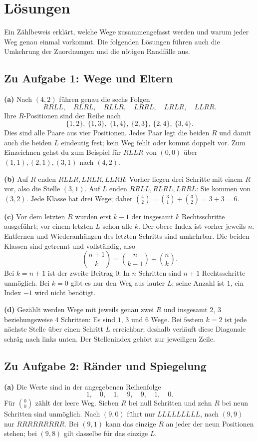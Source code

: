 \clearpage
\section{Lösungen}
\label{bin:solutions}
Ein Zählbeweis erklärt, welche Wege zusammengefasst werden und warum
jeder Weg genau einmal vorkommt. Die folgenden Lösungen führen auch
die Umkehrung der Zuordnungen und die nötigen Randfälle aus.

\subsection*{Zu Aufgabe 1: Wege und Eltern}
\textbf{(a)} Nach $(4,2)$ führen genau die sechs Folgen
\[
 RRLL,\quad RLRL,\quad RLLR,\quad LRRL,\quad LRLR,\quad LLRR.
\]
Ihre $R$-Positionen sind der Reihe nach
\[
 \{1,2\},\ \{1,3\},\ \{1,4\},\ \{2,3\},\ \{2,4\},\ \{3,4\}.
\]
Dies sind alle Paare aus vier Positionen. Jedes Paar legt die beiden
$R$ und damit auch die beiden $L$ eindeutig fest; kein Weg fehlt oder
kommt doppelt vor. Zum Einzeichnen gehst du zum Beispiel für $RLLR$
von $(0,0)$ über $(1,1),(2,1),(3,1)$ nach $(4,2)$.

\textbf{(b)} Auf $R$ enden $RLLR,LRLR,LLRR$: Vorher liegen drei Schritte
mit einem $R$ vor, also die Stelle $(3,1)$. Auf $L$ enden
$RRLL,RLRL,LRRL$: Sie kommen von $(3,2)$. Jede Klasse hat drei Wege;
daher $\binom42=\binom31+\binom32=3+3=6$.

\textbf{(c)} Vor dem letzten $R$ wurden erst $k-1$ der insgesamt $k$
Rechtsschritte ausgeführt; vor einem letzten $L$ schon alle $k$.
Der obere Index ist vorher jeweils $n$. Entfernen und Wiederanhängen
des letzten Schritts sind umkehrbar. Die beiden Klassen sind getrennt
und vollständig, also
\[
 \binom{n+1}k=\binom n{k-1}+\binom nk.
\]
Bei $k=n+1$ ist der zweite Beitrag $0$: In $n$ Schritten sind $n+1$
Rechtsschritte unmöglich. Bei $k=0$ gibt es nur den Weg aus lauter $L$;
seine Anzahl ist $1$, ein Index $-1$ wird nicht benötigt.

\textbf{(d)} Gezählt werden Wege mit jeweils genau zwei $R$ und
insgesamt $2$, $3$ beziehungsweise $4$ Schritten: Es sind $1$, $3$
und $6$ Wege. Bei festem $k=2$ ist jede nächste Stelle über einen
Schritt $L$ erreichbar; deshalb verläuft diese Diagonale schräg nach
links unten. Der Stellenindex gehört zur jeweiligen Zeile.

\subsection*{Zu Aufgabe 2: Ränder und Spiegelung}
\textbf{(a)} Die Werte sind in der angegebenen Reihenfolge
\[
 1,\quad0,\quad1,\quad9,\quad9,\quad1,\quad0.
\]
Für $\binom00$ zählt der leere Weg. Sieben $R$ bei null Schritten
und zehn $R$ bei neun Schritten sind unmöglich. Nach $(9,0)$ führt
nur $LLLLLLLLL$, nach $(9,9)$ nur $RRRRRRRRR$. Bei $(9,1)$ kann
das einzige $R$ an jeder der neun Positionen stehen; bei $(9,8)$
gilt dasselbe für das einzige $L$.

